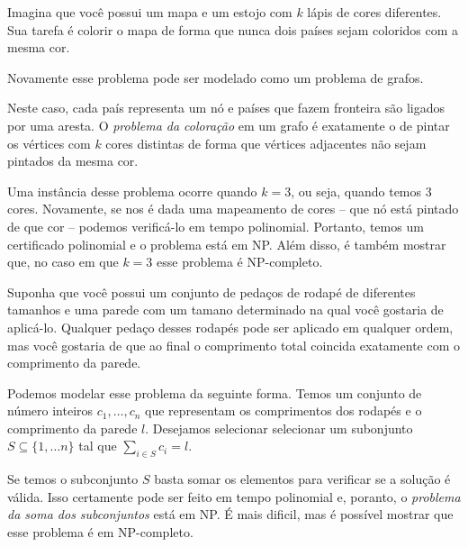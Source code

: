 \begin{example}
  Imagina que você possui um mapa e um estojo com $k$ lápis de cores diferentes.
  Sua tarefa é colorir o mapa de forma que nunca dois países sejam coloridos com a mesma cor.

  Novamente esse problema pode ser modelado como um problema de grafos.

  Neste caso, cada país representa um nó e países que fazem fronteira são ligados por uma aresta.
  O {\em problema da coloração} em um grafo é exatamente o de pintar os vértices com $k$ cores distintas de forma que vértices adjacentes não sejam pintados da mesma cor.

  Uma instância desse problema ocorre quando $k = 3$, ou seja, quando temos 3 cores.
  Novamente, se nos é dada uma mapeamento de cores -- que nó está pintado de que cor -- podemos verificá-lo em tempo polinomial.
  Portanto, temos um certificado polinomial e o problema está em NP.
  Além disso, é também mostrar que, no caso em que $k = 3$ esse problema é NP-completo.
\end{example}

\begin{example}
  Suponha que você possui um conjunto de pedaços de rodapé de diferentes tamanhos e uma parede com um tamano determinado na qual você gostaria de aplicá-lo.
  Qualquer pedaço desses rodapés pode ser aplicado em qualquer ordem, mas você gostaria de que ao final o comprimento total coincida exatamente com o comprimento da parede.
  
  Podemos modelar esse problema da seguinte forma.
  Temos um conjunto de número inteiros $c_1, \dots, c_n$ que representam os comprimentos dos rodapés e o comprimento da parede $l$.
  Desejamos selecionar selecionar um subonjunto $S \subseteq \{1, \dots n\}$ tal que $\sum_{i \in S} c_i = l$.

  Se temos o subconjunto $S$ basta somar os elementos para verificar se a solução é válida.
  Isso certamente pode ser feito em tempo polinomial e, poranto, o {\em problema da soma dos subconjuntos} está em NP.
  É mais dificil, mas é possível mostrar que esse problema é em NP-completo.
\end{example}

